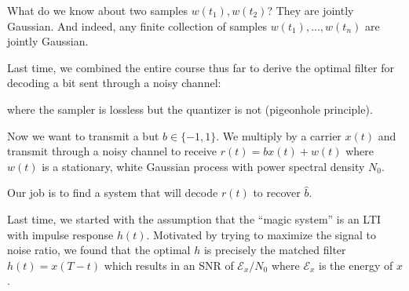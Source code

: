 \documentclass[12pt]{report}
\renewcommand{\hat}[1]{\widehat{#1}}
\newcommand{\Ec}{\mathcal{E}}
\begin{document}
What do we know about two samples $w(t_1), w(t_2)$? They are jointly Gaussian. And indeed, any finite collection of samples $w(t_1), \dots, w(t_n)$ are jointly Gaussian.

Last time, we combined the entire course thus far to derive the optimal filter for decoding a bit sent through a noisy channel: 

\begin{center}
\end{center}
where the sampler is lossless but the quantizer is not (pigeonhole principle).

Now we want to transmit a but $b \in \{-1, 1\}$. We multiply by a carrier $x(t)$ and transmit through a noisy channel to receive $r(t) = b x(t) + w(t)$ where $w(t)$ is a stationary, white Gaussian process with power spectral density $N_0$.

\begin{center}
\end{center}
Our job is to find a system that will decode $r(t)$ to recover $\hat b$. 

Last time, we started with the assumption that the ``magic system'' is an LTI with impulse response $h(t)$. Motivated by trying to maximize the signal to noise ratio, we found that the optimal $h$ is precisely the matched filter $h(t) = x(T - t)$ which results in an SNR of $\Ec_x/N_0$ where $\Ec_x$ is the energy of $x$.

\begin{center}
\end{center}
\end{document}
